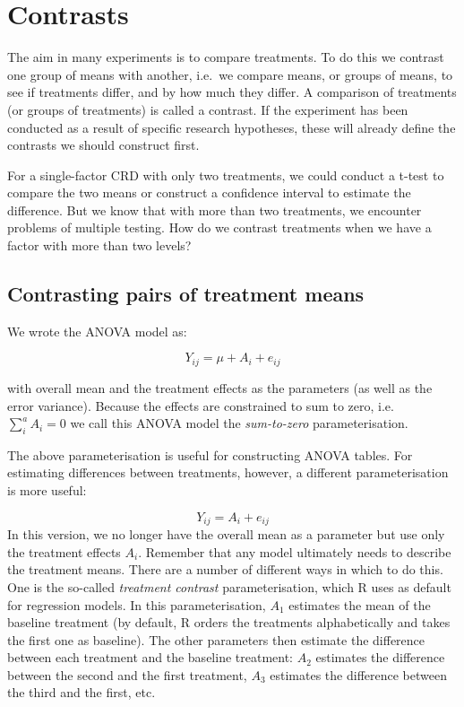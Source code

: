 \documentclass[
  letterpaper,
]{book}
\begin{document}
\chapter{Contrasts}\label{contrasts}

The aim in many experiments is to compare treatments. To do this we
contrast one group of means with another, i.e.~we compare means, or
groups of means, to see if treatments differ, and by how much they
differ. A comparison of treatments (or groups of treatments) is called a
contrast. If the experiment has been conducted as a result of specific
research hypotheses, these will already define the contrasts we should
construct first.

For a single-factor CRD with only two treatments, we could conduct a
t-test to compare the two means or construct a confidence interval to
estimate the difference. But we know that with more than two treatments,
we encounter problems of multiple testing. How do we contrast treatments
when we have a factor with more than two levels?

\section*{Contrasting pairs of treatment
means}\label{contrasting-pairs-of-treatment-means}


We wrote the ANOVA model as:

\[Y_{ij} = \mu + A_i + e_{ij}\]

with overall mean and the treatment effects as the parameters (as well
as the error variance). Because the effects are constrained to sum to
zero, i.e.~\(\sum_i^a A_i = 0\) we call this ANOVA model the
\emph{sum-to-zero} parameterisation.

The above parameterisation is useful for constructing ANOVA tables. For
estimating differences between treatments, however, a different
parameterisation is more useful:

\[Y_{ij} = A_i + e_{ij}\] In this version, we no longer have the overall
mean as a parameter but use only the treatment effects \(A_i\). Remember
that any model ultimately needs to describe the treatment means. There
are a number of different ways in which to do this. One is the so-called
\emph{treatment contrast} parameterisation, which R uses as default for
regression models. In this parameterisation, \(A_1\) estimates the mean
of the baseline treatment (by default, R orders the treatments
alphabetically and takes the first one as baseline). The other
parameters then estimate the difference between each treatment and the
baseline treatment: \(A_2\) estimates the difference between the second
and the first treatment, \(A_3\) estimates the difference between the
third and the first, etc.
\end{document}
